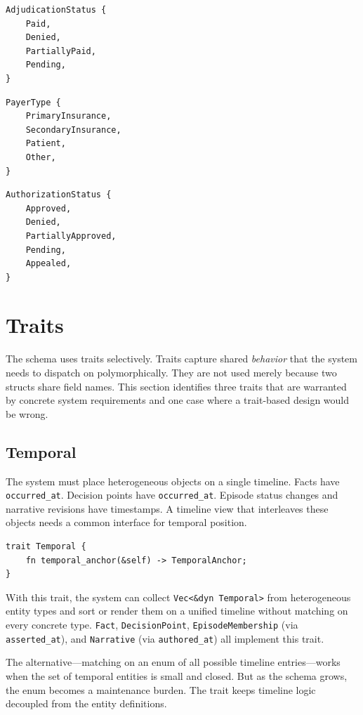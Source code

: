 \documentclass[11pt]{article}
\begin{document}
\begin{lstlisting}
AdjudicationStatus {
    Paid,
    Denied,
    PartiallyPaid,
    Pending,
}
\end{lstlisting}

\begin{lstlisting}
PayerType {
    PrimaryInsurance,
    SecondaryInsurance,
    Patient,
    Other,
}
\end{lstlisting}

\begin{lstlisting}
AuthorizationStatus {
    Approved,
    Denied,
    PartiallyApproved,
    Pending,
    Appealed,
}
\end{lstlisting}

\section{Traits}
\label{sec:traits}

The schema uses traits selectively. Traits capture shared \emph{behavior}
that the system needs to dispatch on polymorphically. They are not used
merely because two structs share field names. This section identifies three
traits that are warranted by concrete system requirements and one case where
a trait-based design would be wrong.

\subsection{Temporal}
\label{sec:trait-temporal}

The system must place heterogeneous objects on a single timeline. Facts have
\texttt{occurred\_at}. Decision points have \texttt{occurred\_at}. Episode
status changes and narrative revisions have timestamps. A timeline view
that interleaves these objects needs a common interface for temporal
position.

\begin{lstlisting}
trait Temporal {
    fn temporal_anchor(&self) -> TemporalAnchor;
}
\end{lstlisting}

With this trait, the system can collect \texttt{Vec<\&dyn Temporal>} from
heterogeneous entity types and sort or render them on a unified timeline
without matching on every concrete type. \texttt{Fact}, \texttt{DecisionPoint},
\texttt{EpisodeMembership} (via \texttt{asserted\_at}), and
\texttt{Narrative} (via \texttt{authored\_at}) all implement this trait.

The alternative---matching on an enum of all possible timeline
entries---works when the set of temporal entities is small and closed. But as
the schema grows, the enum becomes a maintenance burden. The trait keeps
timeline logic decoupled from the entity definitions.
\end{document}
